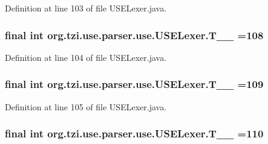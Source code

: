 Definition at line 103 of file U\-S\-E\-Lexer.\-java.

\hypertarget{classorg_1_1tzi_1_1use_1_1parser_1_1use_1_1_u_s_e_lexer_a7c6e1daeb659f724e8197269b87de29b}{
\subsubsection[{T\-\_\-\-\_\-108}]{\setlength{\rightskip}{0pt plus 5cm}final int org.\-tzi.\-use.\-parser.\-use.\-U\-S\-E\-Lexer.\-T\-\_\-\-\_ =108\hspace{0.3cm}{\ttfamily [static]}}}\label{classorg_1_1tzi_1_1use_1_1parser_1_1use_1_1_u_s_e_lexer_a7c6e1daeb659f724e8197269b87de29b}


Definition at line 104 of file U\-S\-E\-Lexer.\-java.

\hypertarget{classorg_1_1tzi_1_1use_1_1parser_1_1use_1_1_u_s_e_lexer_aa420990b55cd7408a8339f739f18a606}{
\subsubsection[{T\-\_\-\-\_\-109}]{\setlength{\rightskip}{0pt plus 5cm}final int org.\-tzi.\-use.\-parser.\-use.\-U\-S\-E\-Lexer.\-T\-\_\-\-\_ =109\hspace{0.3cm}{\ttfamily [static]}}}\label{classorg_1_1tzi_1_1use_1_1parser_1_1use_1_1_u_s_e_lexer_aa420990b55cd7408a8339f739f18a606}


Definition at line 105 of file U\-S\-E\-Lexer.\-java.

\hypertarget{classorg_1_1tzi_1_1use_1_1parser_1_1use_1_1_u_s_e_lexer_a2fae02de444f75ee1fed786252fabac7}{
\subsubsection[{T\-\_\-\-\_\-110}]{\setlength{\rightskip}{0pt plus 5cm}final int org.\-tzi.\-use.\-parser.\-use.\-U\-S\-E\-Lexer.\-T\-\_\-\-\_ =110\hspace{0.3cm}{\ttfamily [static]}}}\label{classorg_1_1tzi_1_1use_1_1parser_1_1use_1_1_u_s_e_lexer_a2fae02de444f75ee1fed786252fabac7}


